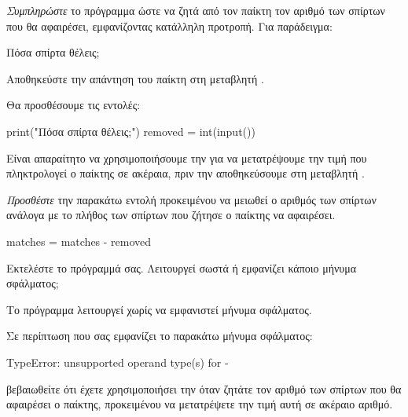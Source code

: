 \documentclass[a4paper,11pt,oneside]{book}
\begin{document}
\begin{step}
\label{step:ask-matches}
\emph{Συμπληρώστε} το πρόγραμμα ώστε να ζητά από τον παίκτη τον αριθμό των σπίρτων που θα αφαιρέσει, εμφανίζοντας κατάλληλη προτροπή. Για παράδειγμα:

\marginnote[14pt]{\iconcomputer}
\begin{pyterm}
Πόσα σπίρτα θέλεις;
\end{pyterm}

Αποθηκεύστε την απάντηση του παίκτη στη μεταβλητή .

\begin{answer}
Θα προσθέσουμε τις εντολές:

\begin{pynew}
print("Πόσα σπίρτα θέλεις;")
removed = int(input())
\end{pynew}

Είναι απαραίτητο να χρησιμοποιήσουμε την  για να μετατρέψουμε την τιμή που πληκτρολογεί ο παίκτης σε ακέραια, πριν την αποθηκεύσουμε στη μεταβλητή . 
\end{answer}
\end{step}

\begin{step}
\label{step:matches-reduce}

\emph{Προσθέστε} την παρακάτω εντολή προκειμένου να μειωθεί ο αριθμός των σπίρτων  ανάλογα με το πλήθος των σπίρτων  που ζήτησε ο παίκτης να αφαιρέσει.

\begin{pynew}
    matches = matches - removed
\end{pynew}

Εκτελέστε το πρόγραμμά σας. Λειτουργεί σωστά ή εμφανίζει κάποιο μήνυμα σφάλματος; 

\begin{answer}
Το πρόγραμμα λειτουργεί χωρίς να εμφανιστεί μήνυμα σφάλματος.
\end{answer}

\marginnote{\iconcaution}
Σε περίπτωση που σας εμφανίζει το παρακάτω μήνυμα σφάλματος: 

\begin{pyterm}
TypeError: unsupported operand type(s) for -
\end{pyterm}

βεβαιωθείτε ότι έχετε χρησιμοποιήσει την  όταν ζητάτε τον αριθμό των σπίρτων που θα αφαιρέσει ο παίκτης, προκειμένου να μετατρέψετε την τιμή αυτή σε ακέραιο αριθμό.
\end{step}
\end{document}

